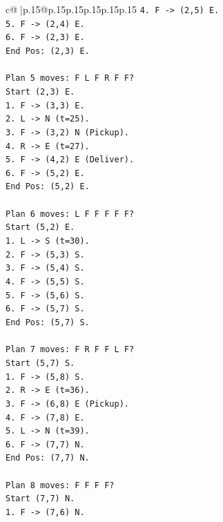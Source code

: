 \documentclass{article}
\begin{document}
{\begin{supertabular}{c@{$\;$}|p{.15\linewidth}@{}p{.15\linewidth}p{.15\linewidth}p{.15\linewidth}p{.15\linewidth}p{.15\linewidth}}
{{{\texttt{4. F {-}> (2,5) E.} \\
\texttt{5. F {-}> (2,4) E.} \\
\texttt{6. F {-}> (2,3) E.} \\
\texttt{End Pos: (2,3) E.} \\
\\ 
\texttt{Plan 5 moves: F L F R F F?} \\
\texttt{Start (2,3) E.} \\
\texttt{1. F {-}> (3,3) E.} \\
\texttt{2. L {-}> N (t=25).} \\
\texttt{3. F {-}> (3,2) N (Pickup).} \\
\texttt{4. R {-}> E (t=27).} \\
\texttt{5. F {-}> (4,2) E (Deliver).} \\
\texttt{6. F {-}> (5,2) E.} \\
\texttt{End Pos: (5,2) E.} \\
\\ 
\texttt{Plan 6 moves: L F F F F F?} \\
\texttt{Start (5,2) E.} \\
\texttt{1. L {-}> S (t=30).} \\
\texttt{2. F {-}> (5,3) S.} \\
\texttt{3. F {-}> (5,4) S.} \\
\texttt{4. F {-}> (5,5) S.} \\
\texttt{5. F {-}> (5,6) S.} \\
\texttt{6. F {-}> (5,7) S.} \\
\texttt{End Pos: (5,7) S.} \\
\\ 
\texttt{Plan 7 moves: F R F F L F?} \\
\texttt{Start (5,7) S.} \\
\texttt{1. F {-}> (5,8) S.} \\
\texttt{2. R {-}> E (t=36).} \\
\texttt{3. F {-}> (6,8) E (Pickup).} \\
\texttt{4. F {-}> (7,8) E.} \\
\texttt{5. L {-}> N (t=39).} \\
\texttt{6. F {-}> (7,7) N.} \\
\texttt{End Pos: (7,7) N.} \\
\\ 
\texttt{Plan 8 moves: F F F F?} \\
\texttt{Start (7,7) N.} \\
\texttt{1. F {-}> (7,6) N.} \\
}}}
\end{supertabular}}
\end{document}
